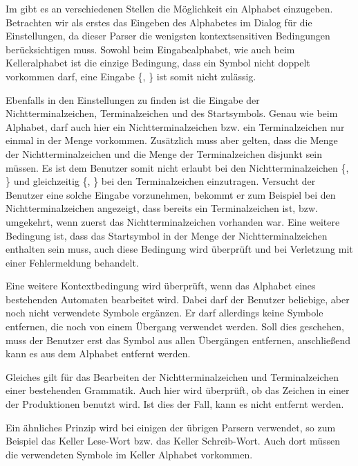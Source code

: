 Im \gtitool gibt es an verschiedenen Stellen die Möglichkeit ein Alphabet
einzugeben. Betrachten wir als erstes das Eingeben des Alphabetes im Dialog für
die Einstellungen, da dieser Parser die wenigsten kontextsensitiven Bedingungen
berücksichtigen muss. Sowohl beim Eingabealphabet, wie auch beim Kelleralphabet
ist die einzige Bedingung, dass ein Symbol nicht doppelt vorkommen darf, eine
Eingabe \{, \} ist somit nicht zulässig.\vspace{10pt}

Ebenfalls in den Einstellungen zu finden ist die Eingabe der
Nichtterminalzeichen, Terminalzeichen und des Startsymbols. Genau wie beim
Alphabet, darf auch hier ein Nichtterminalzeichen bzw. ein Terminalzeichen nur
einmal in der Menge vorkommen. Zusätzlich muss aber gelten, dass die Menge der
Nichtterminalzeichen  und die Menge der Terminalzeichen disjunkt sein müssen. Es
ist dem Benutzer somit nicht erlaubt bei den Nichtterminalzeichen
\{, \} und gleichzeitig
\{, \} bei den Terminalzeichen einzutragen.
Versucht der Benutzer eine solche Eingabe vorzunehmen, bekommt er zum Beispiel
bei den Nichtterminalzeichen angezeigt, dass  bereits ein
Terminalzeichen ist, bzw. umgekehrt, wenn zuerst das Nichtterminalzeichen
vorhanden war. Eine weitere Bedingung ist, dass das Startsymbol in der Menge der
Nichtterminalzeichen enthalten sein muss, auch diese Bedingung wird überprüft
und bei Verletzung mit einer Fehlermeldung behandelt.\vspace{10pt}

Eine weitere Kontextbedingung wird überprüft, wenn das Alphabet eines
bestehenden Automaten bearbeitet wird. Dabei darf der Benutzer beliebige, aber
noch nicht verwendete Symbole ergänzen. Er darf allerdings keine Symbole
entfernen, die noch von einem Übergang verwendet werden. Soll dies geschehen,
muss der Benutzer erst das Symbol aus allen Übergängen entfernen,
anschließend kann es aus dem Alphabet entfernt werden.\vspace{10pt}

Gleiches gilt für das Bearbeiten der Nichtterminalzeichen und Terminalzeichen
einer bestehenden Grammatik. Auch hier wird überprüft, ob das Zeichen in einer
der Produktionen benutzt wird. Ist dies der Fall, kann es nicht entfernt
werden.\vspace{10pt}

Ein ähnliches Prinzip wird bei einigen der übrigen Parsern verwendet, so zum
Beispiel das Keller Lese-Wort bzw. das Keller Schreib-Wort. Auch dort müssen
die verwendeten Symbole im Keller Alphabet vorkommen.\vspace{10pt}


